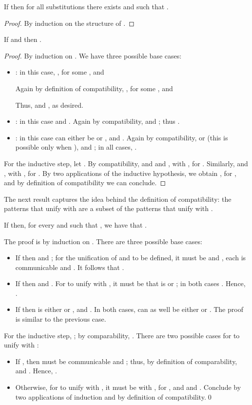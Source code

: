 \documentclass{LMCS}
\begin{document}
\begin{prop}
\label{prop:compat-sub-closed}
If  then for all substitutions  there exists
 and  such that
.
\end{prop}
\begin{proof}
By induction on the structure of .
\end{proof}

\begin{prop}
\label{prop:trans-pattern}
If  and  then .
\end{prop}
\begin{proof}
By induction on . We have three possible base cases:
\begin{itemize}
\item : in this case, , for some , and
	 
	Again by definition of compatibility,
	,
	for some , and 
	
	Thus, 
	and , as desired.
\item : in this case  and . Again by compatibility,
	 and ; thus .
\item : in this case  can either be  or , and . Again by compatibility,
	 or  (this is possible only when ), and ; in all cases, 
	.
\end{itemize}
For the inductive step, let . By compatibility,  and
 and , with
, for . Similarly,  and 
, with , for . 
By two applications of the inductive hypothesis, we obtain , for ,
and by definition of compatibility we can conclude.
\end{proof}

The next result captures the idea behind the definition of
compatibility: the patterns that unify with  are a subset of the
patterns that unify with .

\begin{prop}
\label{lem:pat-lessthan}
If  then, for every  and  such that ,
we have that .
\end{prop}
\proof
The proof is by induction on . There are three possible base cases:
\begin{itemize}
	\item If  then  and ; for the unification of
				 and  to be defined, it must be  and
				, each  is communicable and .
				It follows that .
	\item If  then  and .
				For  to unify with , it must be that  is  or ; in both cases .
				Hence, .
	\item If  then  is either  or , and . 
				In both cases,  can as well be either  or .
				The proof is similar to the previous case.
\end{itemize}
For the inductive step, ; by comparability, .
There are two possible cases for  to unify with :
	\begin{itemize}
	\item If , then  must be communicable and ; 
		thus, by definition of comparability,  and .
		Hence, .
	\item Otherwise, for  to unify with , it must be  
		with , for ,
		and  and . 
		Conclude by two applications of induction and by definition of compatibility.\qed
	\end{itemize}
\end{document}
